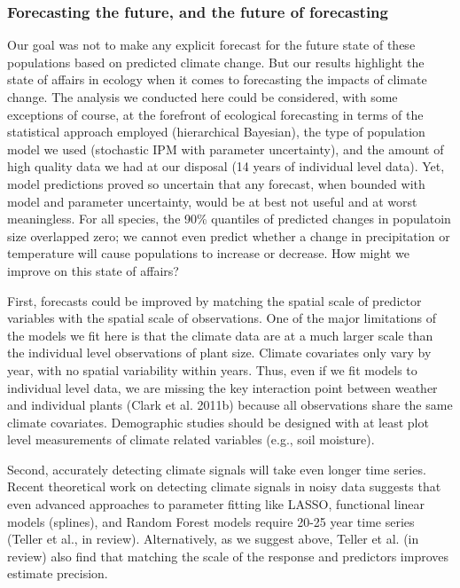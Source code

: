 \documentclass[12pt,]{article}
\begin{document}
\subsubsection{Forecasting the future, and the future of
forecasting}\label{forecasting-the-future-and-the-future-of-forecasting}

Our goal was not to make any explicit forecast for the future state of
these populations based on predicted climate change. But our results
highlight the state of affairs in ecology when it comes to forecasting
the impacts of climate change. The analysis we conducted here could be
considered, with some exceptions of course, at the forefront of
ecological forecasting in terms of the statistical approach employed
(hierarchical Bayesian), the type of population model we used
(stochastic IPM with parameter uncertainty), and the amount of high
quality data we had at our disposal (14 years of individual level data).
Yet, model predictions proved so uncertain that any forecast, when
bounded with model and parameter uncertainty, would be at best not
useful and at worst meaningless. For all species, the 90\% quantiles of
predicted changes in populatoin size overlapped zero; we cannot even
predict whether a change in precipitation or temperature will cause
populations to increase or decrease. How might we improve on this state
of affairs?

First, forecasts could be improved by matching the spatial scale of
predictor variables with the spatial scale of observations. One of the
major limitations of the models we fit here is that the climate data are
at a much larger scale than the individual level observations of plant
size. Climate covariates only vary by year, with no spatial variability
within years. Thus, even if we fit models to individual level data, we
are missing the key interaction point between weather and individual
plants (Clark et al. 2011b) because all observations share the same
climate covariates. Demographic studies should be designed with at least
plot level measurements of climate related variables (e.g., soil
moisture).

Second, accurately detecting climate signals will take even longer time
series. Recent theoretical work on detecting climate signals in noisy
data suggests that even advanced approaches to parameter fitting like
LASSO, functional linear models (splines), and Random Forest models
require 20-25 year time series (Teller et al., in review).
Alternatively, as we suggest above, Teller et al. (in review) also find
that matching the scale of the response and predictors improves estimate
precision.
\end{document}
